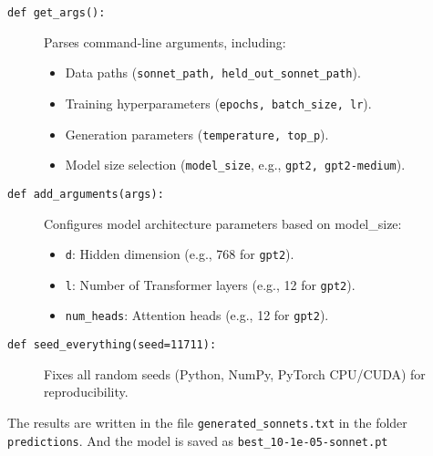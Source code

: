 \begin{description}
\item[\texttt{def get\_args():}]
Parses command-line arguments, including:
\begin{itemize}
\item Data paths (\texttt{sonnet\_path, held\_out\_sonnet\_path}).
\item Training hyperparameters (\texttt{epochs, batch\_size, lr}).
\item Generation parameters (\texttt{temperature, top\_p}).
\item Model size selection (\texttt{model\_size}, e.g., \texttt{gpt2, gpt2-medium}).
\end{itemize}

\item[\texttt{def add\_arguments(args):}]
Configures model architecture parameters based on model\_size:
\begin{itemize}
\item \texttt{d}: Hidden dimension (e.g., 768 for \texttt{gpt2}).
\item \texttt{l}: Number of Transformer layers (e.g., 12 for \texttt{gpt2}).
\item \texttt{num\_heads}: Attention heads (e.g., 12 for \texttt{gpt2}).
\end{itemize}

\item[\texttt{def seed\_everything(seed=11711):}]
Fixes all random seeds (Python, NumPy, PyTorch CPU/CUDA) for reproducibility.

\end{description}

The results are written in the file \texttt{generated\_sonnets.txt} in the folder \texttt{predictions}. And the model is saved as \texttt{best\_10-1e-05-sonnet.pt}

